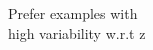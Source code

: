 \documentclass[preview]{standalone}
\begin{document}
\begin{center}
Prefer examples with \\ high variability w.r.t z
\end{center}
\end{document}
